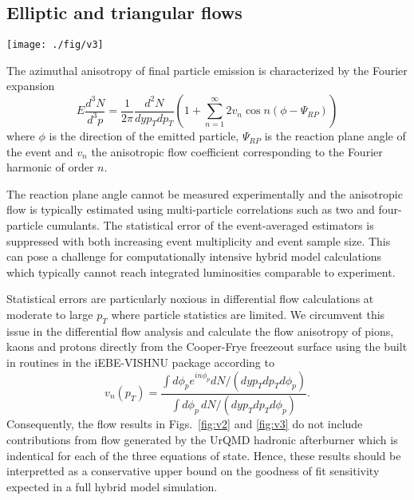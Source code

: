 \documentclass[aps,prc,reprint,amsmath,nofootinbib,superscriptaddress]{revtex4-1}
\begin{document}
\subsection{Elliptic and triangular flows}
\label{flow}

\begin{figure*}[t]
  \texttt{[image: ./fig/v3]}
  \caption{
    \label{fig:v3} Same as Fig.~\ref{fig:v2} but for differential triangular flow $v_3(p_T)$. Note that the y-axis limits in the top row are different.
  }
\end{figure*}

The azimuthal anisotropy of final particle emission is characterized by the Fourier expansion
\begin{equation}
 E \frac{d^3N}{d^3p} = \frac{1}{2\pi} \frac{d^2N}{dy p_T dp_T} \left(1 + \sum\limits_{n=1}^\infty 2 v_n \cos n(\phi - \Psi_{RP}) \right)
\end{equation}
where $\phi$ is the direction of the emitted particle, $\Psi_{RP}$ is the reaction plane angle of the event and $v_n$ the anisotropic flow coefficient corresponding to the Fourier harmonic of order $n$.

The reaction plane angle cannot be measured experimentally and the anisotropic flow is typically estimated using multi-particle correlations such as two and four-particle cumulants. The statistical error of the event-averaged estimators is suppressed with both increasing event multiplicity and event sample size. This can pose a challenge for computationally intensive hybrid model calculations which typically cannot reach integrated luminosities comparable to experiment. 

Statistical errors are particularly noxious in differential flow calculations at moderate to large $p_T$ where particle statistics are limited. We circumvent this issue in the differential flow analysis and calculate the flow anisotropy of pions, kaons and protons directly from the Cooper-Frye freezeout surface using the built in routines in the iEBE-VISHNU package according to
\begin{equation}
 \label{differential_flow}
 v_n(p_T) = \frac{\int d\phi_p e^{i n \phi_p} dN/(dy p_T dp_T d\phi_p)}{\int d\phi_p\, dN/(dy p_T dp_T d\phi_p)}.
\end{equation}
Consequently, the flow results in Figs.~\ref{fig:v2} and \ref{fig:v3} do not include contributions from flow generated by the UrQMD hadronic afterburner which is indentical for each of the three equations of state. Hence, these results should be interpretted as a conservative upper bound on the goodness of fit sensitivity expected in a full hybrid model simulation.
\end{document}
